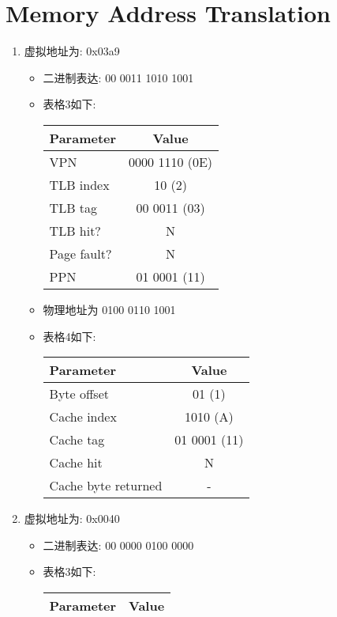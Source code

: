 \documentclass[a4paper,11pt]{article}
\begin{document}
\section{Memory Address Translation}
\begin{enumerate}
\item 虚拟地址为: 0x03a9 \\
\begin{itemize}
	\item 二进制表达: 00 0011 1010 1001
	\item 
	表格3如下:
	\begin{center}
		\begin{tabular}{l|c} \hline
			Parameter & Value \\ \hline
			VPN &  0000 1110 (0E) \\ \hline
			TLB index & 10 (2) \\ \hline
			TLB tag & 00 0011 (03) \\ \hline
			TLB hit? & N \\ \hline
			Page fault? & N \\ \hline
			PPN & 01 0001 (11) \\ \hline
		\end{tabular}
	\end{center}
	\item 物理地址为 0100 0110 1001
	\item 
	表格4如下:
	\begin{center}
		\begin{tabular}{l|c} \hline 
			Parameter & Value \\ \hline
			Byte offset & 01 (1) \\ \hline
			Cache index & 1010 (A) \\ \hline
			Cache tag & 01 0001 (11) \\ \hline 
			Cache hit & N \\ \hline
			Cache byte returned & - \\ \hline 
		\end{tabular}
	\end{center}
\end{itemize}
\item 虚拟地址为: 0x0040 \\
\begin{itemize}
	\item 二进制表达: 00 0000 0100 0000
	\item 
	表格3如下:
	\begin{center}
		\begin{tabular}{l|c} \hline
			Parameter & Value \\ \hline

\end{tabular}
\end{center}
\end{itemize}
\end{enumerate}
\end{document}
